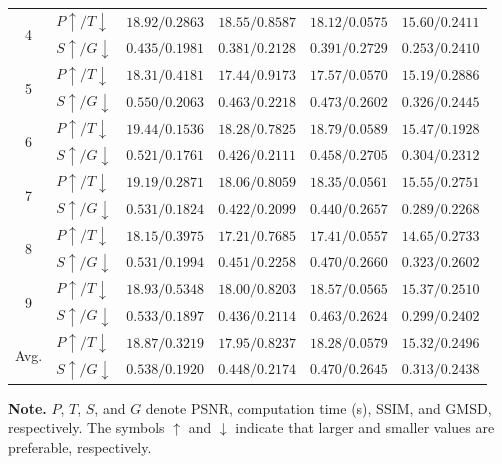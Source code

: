 \begin{table}[htbp]
\begin{tabular}{@{}c l c c c c@{}}
\midrule
\multirow{2}{*}{4}
& \(P\uparrow/T\downarrow\) & \(\mathbf{18.92}/0.2863\) & \(18.55/0.8587\) & \(18.12/\mathbf{0.0575}\) & \(15.60/0.2411\) \\
& \(S\uparrow/G\downarrow\) & \(\mathbf{0.435}/\mathbf{0.1981}\) & \(0.381/0.2128\) & \(0.391/0.2729\) & \(0.253/0.2410\) \\
\midrule
\multirow{2}{*}{5}
& \(P\uparrow/T\downarrow\) & \(\mathbf{18.31}/0.4181\) & \(17.44/0.9173\) & \(17.57/\mathbf{0.0570}\) & \(15.19/0.2886\) \\
& \(S\uparrow/G\downarrow\) & \(\mathbf{0.550}/\mathbf{0.2063}\) & \(0.463/0.2218\) & \(0.473/0.2602\) & \(0.326/0.2445\) \\
\midrule
\multirow{2}{*}{6}
& \(P\uparrow/T\downarrow\) & \(\mathbf{19.44}/0.1536\) & \(18.28/0.7825\) & \(18.79/\mathbf{0.0589}\) & \(15.47/0.1928\) \\
& \(S\uparrow/G\downarrow\) & \(\mathbf{0.521}/\mathbf{0.1761}\) & \(0.426/0.2111\) & \(0.458/0.2705\) & \(0.304/0.2312\) \\
\midrule
\multirow{2}{*}{7}
& \(P\uparrow/T\downarrow\) & \(\mathbf{19.19}/0.2871\) & \(18.06/0.8059\) & \(18.35/\mathbf{0.0561}\) & \(15.55/0.2751\) \\
& \(S\uparrow/G\downarrow\) & \(\mathbf{0.531}/\mathbf{0.1824}\) & \(0.422/0.2099\) & \(0.440/0.2657\) & \(0.289/0.2268\) \\
\midrule
\multirow{2}{*}{8}
& \(P\uparrow/T\downarrow\) & \(\mathbf{18.15}/0.3975\) & \(17.21/0.7685\) & \(17.41/\mathbf{0.0557}\) & \(14.65/0.2733\) \\
& \(S\uparrow/G\downarrow\) & \(\mathbf{0.531}/\mathbf{0.1994}\) & \(0.451/0.2258\) & \(0.470/0.2660\) & \(0.323/0.2602\) \\
\midrule
\multirow{2}{*}{9}
& \(P\uparrow/T\downarrow\) & \(\mathbf{18.93}/0.5348\) & \(18.00/0.8203\) & \(18.57/\mathbf{0.0565}\) & \(15.37/0.2510\) \\
& \(S\uparrow/G\downarrow\) & \(\mathbf{0.533}/\mathbf{0.1897}\) & \(0.436/0.2114\) & \(0.463/0.2624\) & \(0.299/0.2402\) \\
\midrule
\multirow{2}{*}{Avg.}
& \(P\uparrow/T\downarrow\) & \(\mathbf{18.87}/0.3219\) & \(17.95/0.8237\) & \(18.28/\mathbf{0.0579}\) & \(15.32/0.2496\) \\
& \(S\uparrow/G\downarrow\) & \(\mathbf{0.538}/\mathbf{0.1920}\) & \(0.448/0.2174\) & \(0.470/0.2645\) & \(0.313/0.2438\) \\
\bottomrule
\end{tabular}

\vspace{2pt}
\begin{minipage}{\linewidth}
\footnotesize
\textbf{Note.}
\(P\), \(T\), \(S\), and \(G\) denote PSNR, computation time (s),
SSIM, and GMSD, respectively.
The symbols \(\uparrow\) and \(\downarrow\) indicate that
larger and smaller values are preferable, respectively.
\end{minipage}
\end{table}

